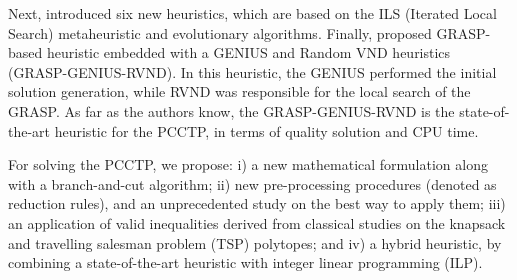 \documentclass{singlecol-new}
\theoremstyle{TH}{
\newtheorem{lemma}{Lemma}
\newtheorem{theorem}[lemma]{Theorem}
\newtheorem{corrolary}[lemma]{Corrolary}
\newtheorem{conjecture}[lemma]{Conjecture}
\newtheorem{proposition}[lemma]{Proposition}
\newtheorem{claim}[lemma]{Claim}
\newtheorem{stheorem}[lemma]{Wrong Theorem}
}
\theoremstyle{THrm}{
\newtheorem{definition}{Definition}[section]
\newtheorem{question}{Question}[section]
\newtheorem{remark}{Remark}
\newtheorem{scheme}{Scheme}
}
\theoremstyle{THhit}{
\newtheorem{case}{Case}[section]
}
\begin{document}






Next, \citet{silva2009problema} introduced  six new heuristics,  which are based on the ILS (Iterated Local Search) metaheuristic and evolutionary algorithms. Finally, \citet{daSilva} proposed GRASP-based heuristic embedded with a GENIUS \citep{genius} and Random VND \citep{SUBRAMANIAN20101899} heuristics (GRASP-GENIUS-RVND). In this heuristic, the GENIUS performed the initial solution generation, while RVND was responsible for the local search of the GRASP. As far as the authors know, the GRASP-GENIUS-RVND is the state-of-the-art heuristic for the PCCTP, in terms of quality solution and CPU time.

For solving the PCCTP, we propose: i) a new mathematical formulation along with a branch-and-cut algorithm; ii) new pre-processing procedures (denoted as reduction rules), and an unprecedented study on the best way to apply them; iii)  an application of valid inequalities derived from classical studies on the knapsack and travelling salesman problem (TSP) polytopes; and iv) a hybrid heuristic, by combining  a state-of-the-art heuristic with integer linear programming (ILP). 
\end{document}
